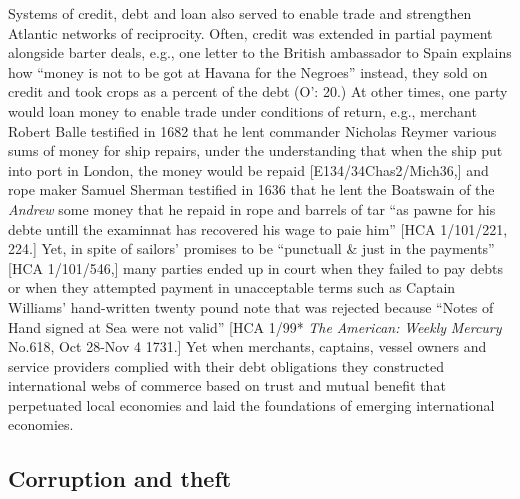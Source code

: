 Systems of credit, debt and loan also served to enable trade and strengthen Atlantic networks of reciprocity. Often, credit was extended in partial payment alongside barter deals, e.g., one letter to the British ambassador to Spain explains how “money is not to be got at Havana for the Negroes” instead, they sold on credit and took crops as a percent of the debt (O’\citealt{Malley2016}: 20.) At other times, one party would loan money to enable trade under conditions of return, e.g., merchant Robert Balle testified in 1682 that he lent commander Nicholas Reymer various sums of money for ship repairs, under the understanding that when the ship put into port in London, the money would be repaid [E134/34Chas2/Mich36,] and rope maker Samuel Sherman testified in 1636 that he lent the Boatswain of the \textit{Andrew} some money that he repaid in rope and barrels of tar “as pawne for his debte untill the examinnat has recovered his wage to paie him” [HCA 1/101/221, 224.] Yet, in spite of sailors’ promises to be “punctuall \& just in the payments” [HCA 1/101/546,] many parties ended up in court when they failed to pay debts or when they attempted payment in unacceptable terms such as Captain Williams’ hand-written twenty pound note that was rejected because “Notes of Hand signed at Sea were not valid” [HCA 1/99* \textit{The} \textit{American:} \textit{Weekly} \textit{Mercury} No.618, Oct 28-Nov 4 1731.] Yet when merchants, captains, vessel owners and service providers complied with their debt obligations they constructed international webs of commerce based on trust and mutual benefit that perpetuated local economies and laid the foundations of emerging international economies. 

\subsection{\textbf{Corruption} \textbf{and} \textbf{theft}}%

